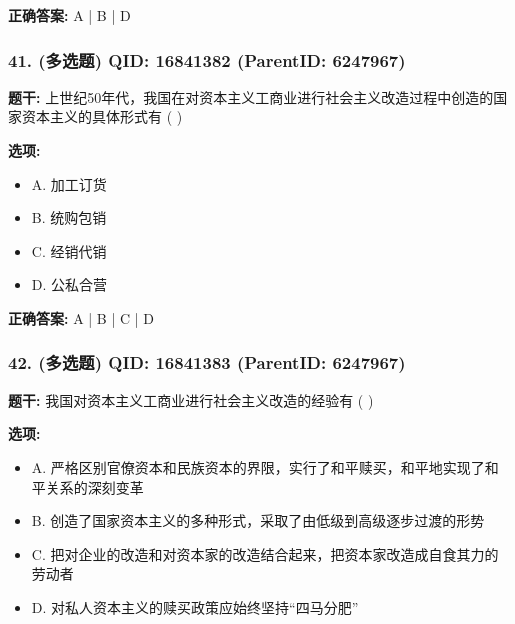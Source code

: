\documentclass[12pt,UTF8]{ctexart}
\begin{document}
\textbf{正确答案:}
A | B | D

\vspace{0.3em}\hrulefill\vspace{0.7em}

\subsubsection*{41. (多选题) \small QID: 16841382 (ParentID: 6247967)}

\textbf{题干:}
上世纪50年代，我国在对资本主义工商业进行社会主义改造过程中创造的国家资本主义的具体形式有 ( )



\textbf{选项:}
\begin{itemize}[leftmargin=*]

  \item A. 加工订货

  \item B. 统购包销

  \item C. 经销代销

  \item D. 公私合营

\end{itemize}

\textbf{正确答案:}
A | B | C | D

\vspace{0.3em}\hrulefill\vspace{0.7em}

\subsubsection*{42. (多选题) \small QID: 16841383 (ParentID: 6247967)}

\textbf{题干:}
我国对资本主义工商业进行社会主义改造的经验有 ( )



\textbf{选项:}
\begin{itemize}[leftmargin=*]

  \item A. 严格区别官僚资本和民族资本的界限，实行了和平赎买，和平地实现了和平关系的深刻变革

  \item B. 创造了国家资本主义的多种形式，采取了由低级到高级逐步过渡的形势

  \item C. 把对企业的改造和对资本家的改造结合起来，把资本家改造成自食其力的劳动者

  \item D. 对私人资本主义的赎买政策应始终坚持“四马分肥”

\end{itemize}
\end{document}
